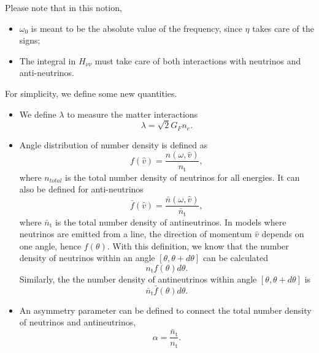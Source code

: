 Please note that in this notion,
\begin{itemize}
    \item $\omega_0$ is meant to be the absolute value of the frequency, since $\eta$ takes care of the signs;
\item The integral in $H_{\nu\nu}$ must take care of both interactions with neutrinos and anti-neutrinos.
\end{itemize}
For simplicity, we define some new quantities.
\begin{itemize}
    \item We define $\lambda$ to measure the matter interactions
    \begin{equation}
        \lambda = \sqrt{2} G_F n_e.
    \end{equation}
\item Angle distribution of number density is defined as
\begin{equation}
    f(\hat v) = \frac{n(\omega,\hat v)}{n_{\mathrm{t}}},
\end{equation}
   where $n_{total}$ is the total number density of neutrinos for all energies. It can also be defined for anti-neutrinos
\begin{equation}
      \bar f(\hat v) = \frac{\bar n(\omega,\hat v)}{\bar n_{\mathrm{t}}},
\end{equation}
where $\bar n_{\mathrm{t}}$ is the total number density of antineutrinos.
In models where neutrinos are emitted from a line, the direction of momentum $\hat v$ depends on one angle, hence $f(\theta)$. With this definition, we know that the number density of neutrinos within an angle $[\theta, \theta + d\theta]$ can be calculated
\begin{equation}
      n_{\mathrm{t}} f(\theta) d\theta.
\end{equation}
Similarly, the the number density of antineutrinos within angle $[\theta,\theta+d\theta]$ is
\begin{equation}
    \bar n_{\mathrm{t}} \bar f(\theta) d\theta.
\end{equation}
\item An asymmetry parameter can be defined to connect the total number density of neutrinos and antineutrinos,
\begin{equation}
    \alpha = \frac{\bar n_{\mathrm{t}} }{n_{\mathrm{t}}}.
\end{equation}

\end{itemize}

